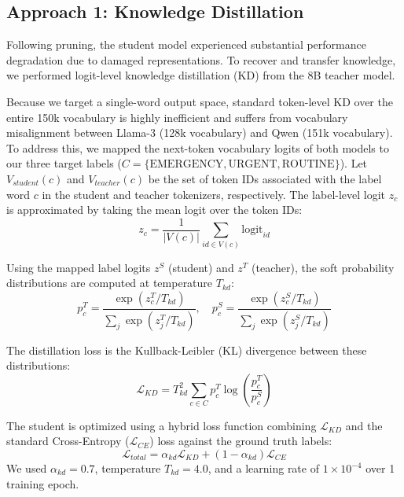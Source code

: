 \documentclass[a4paper, 12pt]{article}
\begin{document}
\subsection{Approach 1: Knowledge Distillation}
Following pruning, the student model experienced substantial performance degradation due to damaged representations. To recover and transfer knowledge, we performed logit-level knowledge distillation (KD) from the 8B teacher model. 

Because we target a single-word output space, standard token-level KD over the entire 150k vocabulary is highly inefficient and suffers from vocabulary misalignment between Llama-3 (128k vocabulary) and Qwen (151k vocabulary). To address this, we mapped the next-token vocabulary logits of both models to our three target labels ($C = \{\text{EMERGENCY}, \text{URGENT}, \text{ROUTINE}\}$). Let $V_{student}(c)$ and $V_{teacher}(c)$ be the set of token IDs associated with the label word $c$ in the student and teacher tokenizers, respectively. The label-level logit $z_c$ is approximated by taking the mean logit over the token IDs:
\begin{equation}
z_{c} = \frac{1}{|V(c)|} \sum_{id \in V(c)} \text{logit}_{id}
\end{equation}

Using the mapped label logits $z^{S}$ (student) and $z^{T}$ (teacher), the soft probability distributions are computed at temperature $T_{kd}$:
\begin{equation}
p_c^T = \frac{\exp(z_c^T / T_{kd})}{\sum_{j} \exp(z_j^T / T_{kd})}, \quad p_c^S = \frac{\exp(z_c^S / T_{kd})}{\sum_{j} \exp(z_j^S / T_{kd})}
\end{equation}

The distillation loss is the Kullback-Leibler (KL) divergence between these distributions:
\begin{equation}
\mathcal{L}_{KD} = T_{kd}^2 \sum_{c \in C} p_c^T \log \left( \frac{p_c^T}{p_c^S} \right)
\end{equation}

The student is optimized using a hybrid loss function combining $\mathcal{L}_{KD}$ and the standard Cross-Entropy ($\mathcal{L}_{CE}$) loss against the ground truth labels:
\begin{equation}
\mathcal{L}_{total} = \alpha_{kd} \mathcal{L}_{KD} + (1 - \alpha_{kd}) \mathcal{L}_{CE}
\end{equation}
We used $\alpha_{kd} = 0.7$, temperature $T_{kd} = 4.0$, and a learning rate of $1\times 10^{-4}$ over 1 training epoch.
\end{document}
